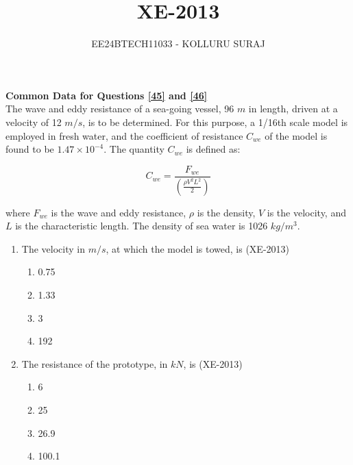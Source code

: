 \documentclass[journal]{IEEEtran}
\numberwithin{equation}{enumi}
\numberwithin{figure}{enumi}
\begin{document}

\title{XE-2013}
\author{EE24BTECH11033 - KOLLURU SURAJ}
{\let\newpage\relax\maketitle}

\textbf{Common Data for Questions \ref{45} and \ref{46} }\\
The wave and eddy resistance of a sea-going vessel, 96 $m$ in length, driven at a velocity of 12 $m/s$, is to be determined. For this purpose, a 1/16th scale model is employed in fresh water, and the coefficient of resistance $C_{we}$ of the model is found to be $1.47 \times 10^{-4}$. The quantity $C_{we}$ is defined as:

\[
C_{we} = \frac{F_{we}}{\left(\frac{\rho V^2 L^2}{2}\right)}
\]

where $F_{we}$ is the wave and eddy resistance, $\rho$ is the density, $V$ is the velocity, and $L$ is the characteristic length. The density of sea water is 1026 $kg/m^3$. 

\begin{enumerate}
    \item The velocity in $m/s$, at which the model is towed, is \label{45} \hfill(XE-2013)
    \begin{multicols}{4}
        \begin{enumerate}
            \item 0.75
            \item 1.33
            \item 3
            \item 192
        \end{enumerate}
    \end{multicols}

    \item The resistance of the prototype, in $kN$, is \label{46} \hfill(XE-2013)
    \begin{multicols}{4}
        \begin{enumerate}[label=(\Alph*)]
            \item 6
            \item 25
            \item 26.9
            \item 100.1
        \end{enumerate}
    \end{multicols}
\end{enumerate}
\end{document}
